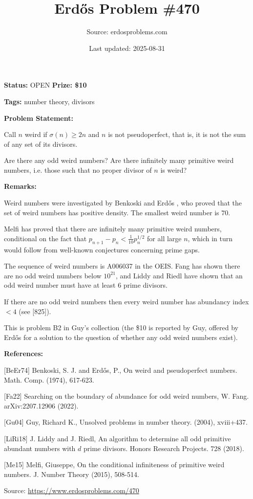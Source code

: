 \documentclass{article}
\title{Erd\H{o}s Problem \#470}
\date{Last updated: 2025-08-31}
\author{Source: erdosproblems.com}
\begin{document}
\maketitle

\noindent\textbf{Status:} OPEN \quad \textbf{Prize: \$10}

\noindent\textbf{Tags:} number theory, divisors

\medskip
\noindent\textbf{Problem Statement:}

Call $n$ weird if $\sigma(n)\geq 2n$ and $n$ is not pseudoperfect, that is, it is not the sum of any set of its divisors.

Are there any odd weird numbers? Are there infinitely many primitive weird numbers, i.e. those such that no proper divisor of $n$ is weird?

\bigskip
\noindent\textbf{Remarks:}

Weird numbers were investigated by Benkoski and Erd\H{o}s \cite{BeEr74}, who proved that the set of weird numbers has positive density. The smallest weird number is $70$.

Melfi \cite{Me15} has proved that there are infinitely many primitive weird numbers, conditional on the fact that $p_{n+1}-p_n<\frac{1}{10}p_n^{1/2}$ for all large $n$, which in turn would follow from well-known conjectures concerning prime gaps.

The sequence of weird numbers is A006037 in the OEIS. Fang \cite{Fa22} has shown there are no odd weird numbers below $10^{21}$, and Liddy and Riedl \cite{LiRi18} have shown that an odd weird number must have at least 6 prime divisors.

If there are no odd weird numbers then every weird number has abundancy index $<4$ (see [825]).

This is problem B2 in Guy's collection \cite{Gu04} (the \$10 is reported by Guy, offered by Erd\H{o}s for a solution to the question of whether any odd weird numbers exist).

\bigskip
\noindent\textbf{References:}

[BeEr74] Benkoski, S. J. and Erd\H{o}s, P., On weird and pseudoperfect numbers. Math. Comp. (1974), 617-623.
 
 [Fa22] Searching on the boundary of abundance for odd weird numbers, W. Fang. arXiv:2207.12906 (2022).
 
 [Gu04] Guy, Richard K., Unsolved problems in number theory. (2004), xviii+437.
 
 [LiRi18] J. Liddy and J. Riedl, An algorithm to determine all odd primitive abundant numbers with $d$ prime divisors. Honors Research Projects. 728 (2018).
 
 [Me15] Melfi, Giuseppe, On the conditional infiniteness of primitive weird numbers. J. Number Theory (2015), 508-514.

\bigskip
\noindent\small{Source: \url{https://www.erdosproblems.com/470}}
\end{document}
